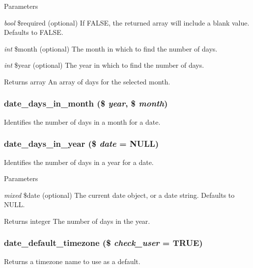 \begin{DoxyParams}{Parameters}
\item[{\em bool}]\$required (optional) If FALSE, the returned array will include a blank value. Defaults to FALSE. \item[{\em int}]\$month (optional) The month in which to find the number of days. \item[{\em int}]\$year (optional) The year in which to find the number of days.\end{DoxyParams}
\begin{DoxyReturn}{Returns}
array An array of days for the selected month. 
\end{DoxyReturn}
\hypertarget{date__api_8module_ab98127065d91ca887cbae1675622ca90}{
\subsubsection[{date\_\-days\_\-in\_\-month}]{\setlength{\rightskip}{0pt plus 5cm}date\_\-days\_\-in\_\-month (\$ {\em year}, \/  \$ {\em month})}}
\label{date__api_8module_ab98127065d91ca887cbae1675622ca90}
Identifies the number of days in a month for a date. \hypertarget{date__api_8module_a37d190c0e72a50d069ba56ef8004730b}{
\subsubsection[{date\_\-days\_\-in\_\-year}]{\setlength{\rightskip}{0pt plus 5cm}date\_\-days\_\-in\_\-year (\$ {\em date} = {\ttfamily NULL})}}
\label{date__api_8module_a37d190c0e72a50d069ba56ef8004730b}
Identifies the number of days in a year for a date.


\begin{DoxyParams}{Parameters}
\item[{\em mixed}]\$date (optional) The current date object, or a date string. Defaults to NULL.\end{DoxyParams}
\begin{DoxyReturn}{Returns}
integer The number of days in the year. 
\end{DoxyReturn}
\hypertarget{date__api_8module_a0804735c8d110e91ba3129bef5d8ec78}{
\subsubsection[{date\_\-default\_\-timezone}]{\setlength{\rightskip}{0pt plus 5cm}date\_\-default\_\-timezone (\$ {\em check\_\-user} = {\ttfamily TRUE})}}
\label{date__api_8module_a0804735c8d110e91ba3129bef5d8ec78}
Returns a timezone name to use as a default.


